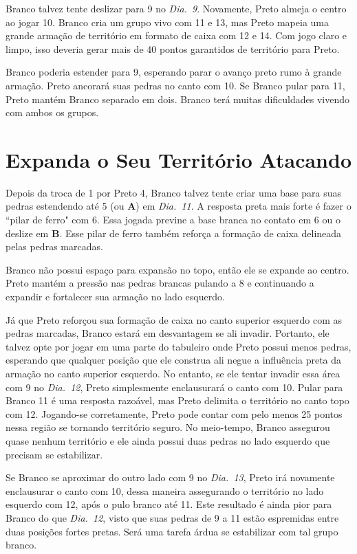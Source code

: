 Branco talvez tente deslizar  para 9 no \emph{Dia.\@~9}. Novamente, Preto almeja o centro ao jogar 10. Branco cria um grupo vivo com 11 e 13, mas Preto mapeia uma grande armação de território em formato de caixa com 12 e 14. Com jogo claro e limpo, isso deveria gerar mais de 40 pontos garantidos de território para Preto.

Branco poderia estender para 9, esperando parar o avanço preto rumo à grande armação. Preto ancorará suas pedras no canto com 10. Se Branco pular para 11, Preto mantém Branco separado em dois. Branco terá muitas dificuldades vivendo com ambos os grupos.

\section{Expanda o Seu Território Atacando}

Depois da troca de 1 por Preto 4, Branco talvez tente criar uma base para suas pedras estendendo até 5 (ou \textbf{A}) em \emph{Dia.\@~11}. A resposta preta mais forte é fazer o ``pilar de ferro" com 6. Essa jogada previne a base branca no contato em 6 ou o deslize em \textbf{B}. Esse pilar de ferro também reforça a formação de caixa delineada pelas pedras marcadas.

Branco não possui espaço para expansão no topo, então ele se expande ao centro. Preto mantém a pressão nas pedras brancas pulando a 8 e continuando a expandir e fortalecer sua armação no lado esquerdo.

Já que Preto reforçou sua formação de caixa no canto superior esquerdo com as pedras marcadas, Branco estará em desvantagem se ali invadir. Portanto, ele talvez opte por jogar em uma parte do tabuleiro onde Preto possui menos pedras, esperando que qualquer posição que ele construa ali negue a influência preta da armação no canto superior esquerdo. No entanto, se ele tentar invadir essa área com 9 no \emph{Dia.\@~12}, Preto simplesmente enclausurará o canto com 10. Pular para Branco 11 é uma resposta razoável, mas Preto delimita o território no canto topo com 12. Jogando-se corretamente, Preto pode contar com pelo menos 25 pontos nessa região se tornando território seguro. No meio-tempo, Branco assegurou quase nenhum território e ele ainda possui duas pedras no lado esquerdo que precisam se estabilizar. 

Se Branco se aproximar do outro lado com 9 no \emph{Dia.\@~13}, Preto irá novamente enclausurar o canto com 10, dessa maneira assegurando o território no lado esquerdo com 12, após o pulo branco até 11. Este resultado é ainda pior para Branco do que \emph{Dia.\@~12}, visto que suas pedras de 9 a 11 estão espremidas  entre duas posições fortes pretas. Será uma tarefa árdua se estabilizar com tal grupo branco.


